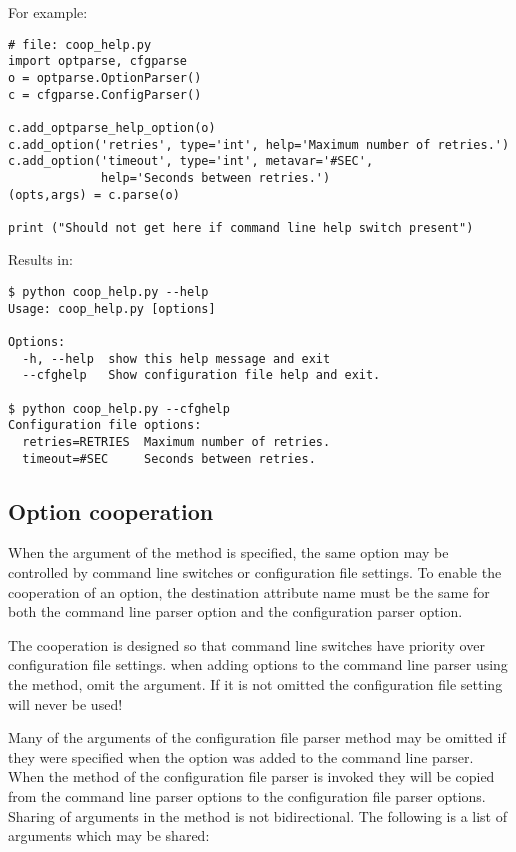 \documentclass{howto}
\begin{document}
For example:

\begin{verbatim}
# file: coop_help.py
import optparse, cfgparse
o = optparse.OptionParser()
c = cfgparse.ConfigParser()

c.add_optparse_help_option(o)
c.add_option('retries', type='int', help='Maximum number of retries.')
c.add_option('timeout', type='int', metavar='#SEC', 
             help='Seconds between retries.')
(opts,args) = c.parse(o)

print ("Should not get here if command line help switch present")
\end{verbatim}

Results in:
\begin{verbatim}
$ python coop_help.py --help
Usage: coop_help.py [options]

Options:
  -h, --help  show this help message and exit
  --cfghelp   Show configuration file help and exit.

$ python coop_help.py --cfghelp
Configuration file options:
  retries=RETRIES  Maximum number of retries.
  timeout=#SEC     Seconds between retries.
\end{verbatim}

\subsection{Option cooperation\label{cfgparse-coop-option}}

When the  argument of the  method is specified,
the same option may be controlled by command line switches or configuration 
file settings.  To enable the cooperation of an option, the destination 
attribute name must be the same for both the command line parser option and 
the configuration parser option.

The cooperation is designed so that command line switches have priority
over configuration file settings.   when adding
options to the command line parser using the  method,
omit the  argument.  If it is not omitted the 
configuration file setting will never be used!

Many of the arguments of the configuration file parser 
method may be omitted if they were specified when the option was added to 
the command line parser.  When the  method of the configuration
file parser is invoked they will be copied from the command line parser options
to the configuration file parser options.  Sharing of arguments in the  
method is not bidirectional.  The following is a list of arguments
which may be shared:
\end{document}
